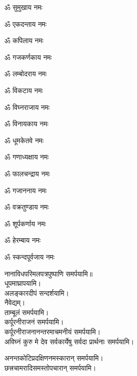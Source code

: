 \begin{enumerate}%
\begin{minipage}{0.475\linewidth}   
\item ॐ सुमुखाय नमः
\item ॐ एकदन्ताय नमः
\item ॐ कपिलाय नमः
\item ॐ गजकर्णकाय नमः
\item ॐ लम्बोदराय नमः
\item ॐ विकटाय नमः
\item ॐ विघ्नराजाय नमः
\item ॐ विनायकाय नमः
  \end{minipage}
  \begin{minipage}{0.525\linewidth}
\item ॐ धूमकेतवे नमः
\item ॐ गणाध्यक्षाय नमः
\item ॐ फालचन्द्राय नमः
\item ॐ गजाननाय नमः
\item ॐ वक्रतुण्डाय नमः
\item ॐ शूर्पकर्णाय नमः
\item ॐ हेरम्बाय नमः
\item ॐ स्कन्दपूर्वजाय नमः
  \end{minipage}
\end{enumerate}
नानाविधपरिमलपत्रपुष्पाणि समर्पयामि॥\\
धूपमाघ्रापयामि।\\
अलङ्कारदीपं सन्दर्शयामि।\\
नैवेद्यम्।\\
ताम्बूलं समर्पयामि।\\
कर्पूरनीराजनं समर्पयामि।\\
कर्पूरनीराजनानन्तरमाचमनीयं समर्पयामि।\\

{अविघ्नं कुरु मे देव सर्वकार्येषु सर्वदा}
प्रार्थनाः समर्पयामि।

अनन्तकोटिप्रदक्षिणनमस्कारान् समर्पयामि।\\
छत्त्रचामरादिसमस्तोपचारान् समर्पयामि।\\
